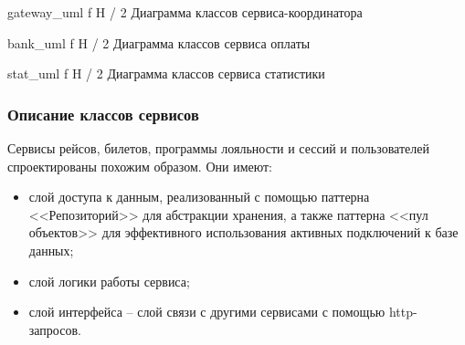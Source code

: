 {gateway_uml} %
{f} %
{H} %
{\textwidth / 2} %
{Диаграмма классов сервиса-координатора} %


{bank_uml} %
{f} %
{H} %
{\textwidth / 2} %
{Диаграмма классов сервиса оплаты} %


{stat_uml} %
{f} %
{H} %
{\textwidth / 2} %
{Диаграмма классов сервиса статистики} %
\newpage
\subsubsection{Описание классов сервисов}

Сервисы рейсов, билетов, программы лояльности и сессий и пользователей спроектированы похожим образом. Они имеют:
\begin{itemize}
    \item слой доступа к данным, реализованный с помощью паттерна <<Репозиторий>> для абстракции хранения, а также паттерна <<пул объектов>> для эффективного использования активных подключений к базе данных;
    \item слой логики работы сервиса;
    \item слой интерфейса -- слой связи с другими сервисами с помощью http-запросов.
\end{itemize}

